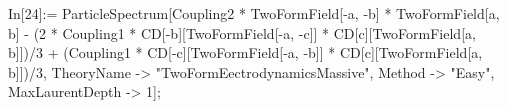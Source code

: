 In[24]:= ParticleSpectrum[Coupling2 * TwoFormField[-a, -b] * TwoFormField[a, b] - (2 * Coupling1 * CD[-b][TwoFormField[-a, -c]] * CD[c][TwoFormField[a, b]])/3 + (Coupling1 * CD[-c][TwoFormField[-a, -b]] * CD[c][TwoFormField[a, b]])/3, TheoryName -> "TwoFormEectrodynamicsMassive", Method -> "Easy", MaxLaurentDepth -> 1]; 